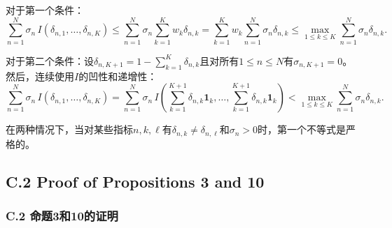 \documentclass[12pt,a4paper]{article}
\newenvironment{translation}
  {\par\noindent{\color{transblue}\ignorespaces}}
  {\par\medskip}
\begin{document}
\begin{translation}
对于第一个条件：
\[
\sum_{n=1}^{N} \sigma_{n} \, I(\delta_{n,1}, \dots, \delta_{n,K})
\leq \sum_{n=1}^{N} \sigma_{n} \sum_{k=1}^{K} w_{k} \delta_{n,k}
= \sum_{k=1}^{K} w_{k} \sum_{n=1}^{N} \sigma_{n} \delta_{n,k}
\leq \max_{1 \leq k \leq K} \sum_{n=1}^{N} \sigma_{n} \delta_{n,k}.
\]

对于第二个条件：设$\delta_{n,K+1} = 1 - \sum_{k=1}^{K} \delta_{n,k}$且对所有$1 \leq n \leq N$有$\sigma_{n,K+1} = 0$。然后，连续使用$I$的凹性和递增性：
\[
\sum_{n=1}^{N} \sigma_{n} \, I(\delta_{n,1}, \dots, \delta_{n,K})
= \sum_{n=1}^{N} \sigma_{n} \, I\!\left( \sum_{k=1}^{K+1} \delta_{n,k} \mathbf{1}_{k}, \dots, \sum_{k=1}^{K+1} \delta_{n,k} \mathbf{1}_{k} \right)
< \max_{1 \leq k \leq K} \sum_{n=1}^{N} \sigma_{n} \delta_{n,k}.
\]

在两种情况下，当对某些指标$n, k, \ell$有$\delta_{n,k} \neq \delta_{n,\ell}$和$\sigma_{n} > 0$时，第一个不等式是严格的。
\end{translation}

\subsection*{C.2 Proof of Propositions 3 and 10}
{\color{transblue}\subsubsection*{C.2 命题3和10的证明}}
\end{document}

